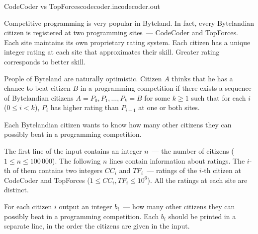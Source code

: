 
\begin{problem}{CodeCoder vs TopForces}{codecoder.in}{codecoder.out}{\timeLimit}


Competitive programming is very popular in Byteland. 
In fact, every Bytelandian citizen is registered at two programming sites~---
CodeCoder and TopForces. 
Each site maintains its own proprietary rating system. 
Each citizen has a unique integer rating at each site that approximates their skill.
Greater rating corresponds to better skill.

People of Byteland are naturally optimistic. 
Citizen $A$ thinks that he has a chance to beat citizen $B$ in a programming competition
if there exists a sequence of Bytelandian citizens $A = P_0, P_1, \ldots, P_k = B$
for some $k \geq 1$ such that for each $i$ ($0 \leq i < k$), $P_i$ has higher rating
than $P_{i + 1}$ at one or both sites.

Each Bytelandian citizen wants to know how many other citizens they can possibly beat 
in a programming competition.

\InputFile

The first line of the input contains an integer $n$~--- the number of
citizens ($1 \leq n \leq 100\,000$).
The following $n$ lines contain information about ratings. The $i$-th of them
contains two integers $CC_i$ and $TF_i$~--- ratings of the $i$-th 
citizen at CodeCoder and TopForces
($1 \leq CC_i, TF_i \leq 10^6$).
All the ratings at each site are distinct.

\OutputFile

For each citizen $i$ output an integer $b_i$~---
how many other citizens they can possibly beat in a programming competition.
Each $b_i$ should be printed in a separate line, in the order
the citizens are given in the input.

\Example

\begin{example}
%
\end{example}

\end{problem}

